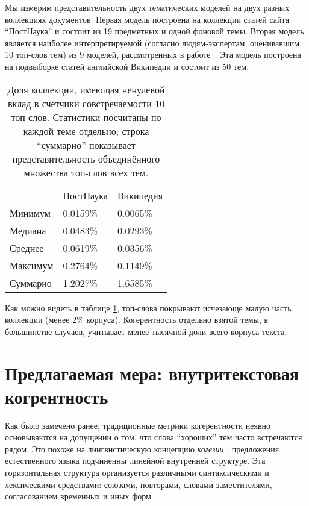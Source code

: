 
Мы измерим представительность двух тематических моделей на двух разных коллекциях документов. Первая модель построена на коллекции статей сайта ``ПостНаука'' и состоит из 19 предметных и одной фоновой темы. Вторая модель является наиболее интерпретируемой (согласно людям-экспертам, оценивавшим 10 топ-слов тем) из 9 моделей, рассмотренных в работе~\cite{rtl}. Эта модель построена на подвыборке статей английской Википедии и состоит из 50 тем.

\begin{table}[ht]
\begin{tabular}{lll}
         & ПостНаука & Википедия \\
Минимум  & 0.0159\%  & 0.0065\%  \\
Медиана  & 0.0483\%  & 0.0293\%  \\
Среднее  & 0.0619\%  & 0.0356\%  \\
Максимум & 0.2764\%  & 0.1149\%  \\
Суммарно & 1.2027\%  & 1.6585\% 
\end{tabular}
    \caption{
      Доля коллекции, имеющая ненулевой вклад в счётчики совстречаемости 10 топ-слов. Статистики посчитаны по каждой теме отдельно; строка ``суммарно'' показывает представительность объединённого множества топ-слов всех тем.
    }
    \label{table:represented}
\end{table}

Как можно видеть в таблице \ref{table:represented}, топ-слова покрывают исчезающе малую часть коллекции (менее 2\% корпуса). Когерентность отдельно взятой темы, в большинстве случаев, учитывает менее тысячной доли всего корпуса текста.


\section{Предлагаемая мера: внутритекстовая когрентность}

Как было замечено ранее, традиционные метрики когерентности неявно основываются на допущении о том, что слова ``хороших'' тем часто встречаются рядом. Это похоже на лингвистическую концепцию \textit{когезии} \cite{halliday1976cohesion}: предложения естественного языка подчиненны линейной внутренней структуре. Эта горизонтальная структура организуется 
различными синтаксическими и лексическими средствами: союзами, повторами, словами-заместителями, согласованием временных и иных форм \cite{kazachenko2009}.

